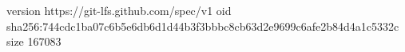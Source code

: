 version https://git-lfs.github.com/spec/v1
oid sha256:744cdc1ba07c6b5e6db6d1d44b3f3bbbc8cb63d2e9699c6afe2b84d4a1c5332c
size 167083
